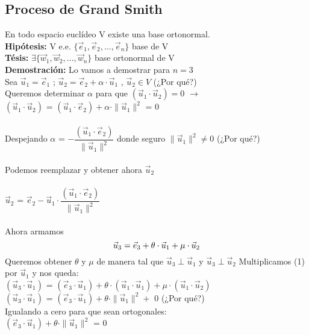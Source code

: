 \documentclass{article}
\begin{document}
\subsection{Proceso de Grand Smith}
En todo espacio euclídeo V existe una base ortonormal.\\
\textbf{Hipótesis:} V e.e. $\{\vec{e}_1, \vec{e}_2, \hdots, \vec{e}_n\}$ base de V \\
\textbf{Tésis:} $\exists \{\vec{w}_1, \vec{w}_2, \hdots, \vec{w}_n\}$ base ortonormal de V\\
\textbf{Demostración:} Lo vamos a demostrar para $n=3$\\
Sea $\vec{u}_1 = \vec{e}_1$ ; $\vec{u}_2 = \vec{e}_2 + \alpha\cdot\vec{u}_1$ , $\vec{u}_2 \in V$ (¿Por qué?)\\
Queremos determinar $\alpha$ para que $(\vec{u}_1\cdot\vec{u}_2) = 0$ $\rightarrow$ \\
$(\vec{u}_1\cdot\vec{u}_2)$ = $ (\vec{u}_1\cdot\vec{e}_2) + \alpha\cdot\parallel\vec{u}_1\parallel^2 $ = $0$\\\\
Despejando $\alpha$ = $- \dfrac{(\vec{u}_1\cdot\vec{e}_2)}{\parallel\vec{u}_1\parallel^2}$ \indent donde seguro $\parallel\vec{u}_1\parallel^2 \neq 0$ (¿Por qué?) \\\\
Podemos reemplazar y obtener ahora $\vec{u}_2$\\\\
$\vec{u}_2$ = $\vec{e}_2 - \vec{u}_1 \cdot \dfrac{(\vec{u}_1\cdot\vec{e}_2)}{\parallel\vec{u}_1\parallel^2}$\\\\
Ahora armamos
\begin{equation}
\vec{u}_3 = \vec{e}_3 + \theta \cdot \vec{u}_1 + \mu \cdot \vec{u}_2\\
\end{equation} 
Queremos obtener $\theta$ y $\mu$ de manera tal que $\vec{u}_3\perp\vec{u}_1$ y $\vec{u}_3\perp\vec{u}_2$
\newpage
\noindent Multiplicamos (1) por $\vec{u}_1$ y nos queda: \\
$(\vec{u}_3\cdot\vec{u}_1)$ = $(\vec{e}_3\cdot\vec{u}_1) + \theta\cdot(\vec{u}_1\cdot\vec{u}_1) + \mu \cdot (\vec{u}_1\cdot\vec{u}_2)$ \\
$(\vec{u}_3\cdot\vec{u}_1)$ = $(\vec{e}_3\cdot\vec{u}_1) + \theta\cdot\parallel\vec{u}_1\parallel^2 +$ $0$ (¿Por qué?)\\
Igualando a cero para que sean ortogonales: \\
$(\vec{e}_3\cdot\vec{u}_1) + \theta\cdot\parallel\vec{u}_1\parallel^2$ = 0\\\\
\end{document}
